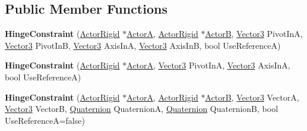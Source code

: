 \subsection*{Public Member Functions}
\begin{DoxyCompactItemize}
\item 
\hypertarget{classphys_1_1HingeConstraint_a0ee9255d9d3af90cf611195852299367}{
{\bfseries HingeConstraint} (\hyperlink{classphys_1_1ActorRigid}{ActorRigid} $\ast$\hyperlink{classphys_1_1TypedConstraint_a0fefb80c80d433bec9942b851b2f5a8a}{ActorA}, \hyperlink{classphys_1_1ActorRigid}{ActorRigid} $\ast$\hyperlink{classphys_1_1TypedConstraint_a04d2c49698d9a161e92112dd1efc1dcd}{ActorB}, \hyperlink{classphys_1_1Vector3}{Vector3} PivotInA, \hyperlink{classphys_1_1Vector3}{Vector3} PivotInB, \hyperlink{classphys_1_1Vector3}{Vector3} AxisInA, \hyperlink{classphys_1_1Vector3}{Vector3} AxisInB, bool UseReferenceA)}
\label{d3/d0d/classphys_1_1HingeConstraint_a0ee9255d9d3af90cf611195852299367}

\item 
\hypertarget{classphys_1_1HingeConstraint_ad3fbe05bb3ab370d20935f9467b81dd3}{
{\bfseries HingeConstraint} (\hyperlink{classphys_1_1ActorRigid}{ActorRigid} $\ast$\hyperlink{classphys_1_1TypedConstraint_a0fefb80c80d433bec9942b851b2f5a8a}{ActorA}, \hyperlink{classphys_1_1Vector3}{Vector3} PivotInA, \hyperlink{classphys_1_1Vector3}{Vector3} AxisInA, bool UseReferenceA)}
\label{d3/d0d/classphys_1_1HingeConstraint_ad3fbe05bb3ab370d20935f9467b81dd3}

\item 
\hypertarget{classphys_1_1HingeConstraint_acf99af18e95c5b42119d91aff8a02a2a}{
{\bfseries HingeConstraint} (\hyperlink{classphys_1_1ActorRigid}{ActorRigid} $\ast$\hyperlink{classphys_1_1TypedConstraint_a0fefb80c80d433bec9942b851b2f5a8a}{ActorA}, \hyperlink{classphys_1_1ActorRigid}{ActorRigid} $\ast$\hyperlink{classphys_1_1TypedConstraint_a04d2c49698d9a161e92112dd1efc1dcd}{ActorB}, \hyperlink{classphys_1_1Vector3}{Vector3} VectorA, \hyperlink{classphys_1_1Vector3}{Vector3} VectorB, \hyperlink{classphys_1_1Quaternion}{Quaternion} QuaternionA, \hyperlink{classphys_1_1Quaternion}{Quaternion} QuaternionB, bool UseReferenceA=false)}
\label{d3/d0d/classphys_1_1HingeConstraint_acf99af18e95c5b42119d91aff8a02a2a}


\end{DoxyCompactItemize}
